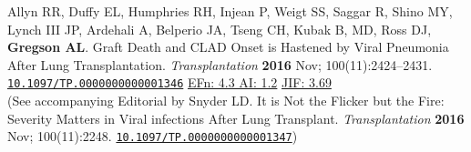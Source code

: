 \documentclass[letterpaper,11pt,sans,dvipsnames,final]{/usr/local/share/texmf-dist/tex/latex/moderncv/moderncv}%
\begin{document}
\begin{thebibliography}{1}
  \bibitem[33]{} Allyn RR, Duffy EL, Humphries RH, Injean P, Weigt SS, Saggar R, Shino MY, Lynch III JP, Ardehali A, Belperio JA, Tseng CH, Kubak B, MD, Ross DJ, \textbf{Gregson AL}. Graft Death and CLAD Onset is Hastened by Viral Pneumonia After Lung Transplantation. {\color{BrickRed}\textit{Transplantation}} \textbf{2016} Nov; 100(11):2424--2431. \href{http://ovidsp.tx.ovid.com/sp-3.20.0b/ovidweb.cgi?WebLinkFrameset=1&S=MPIKFPIHKADDNFMANCIKCCFBPPEGAA00&returnUrl=ovidweb.cgi%3fMain%2bSearch%2bPage%3d1%26S%3dMPIKFPIHKADDNFMANCIKCCFBPPEGAA00&directlink=http%3a%2f%2fovidsp.tx.ovid.com%2fovftpdfs%2fFPDDNCFBCCMAKA00%2ffs046%2fovft%2flive%2fgv025%2f00007890%2f00007890-900000000-97328.pdf&filename=Graft+Loss+and+Clad+Onset+is+Hastened+by+Viral+Pneumonia+After+Lung+Transplantation.&navigation_links=NavLinks.S.sh.22.1&link_from=S.sh.22%7c1&pdf_key=FPDDNCFBCCMAKA00&pdf_index=/fs046/ovft/live/gv025/00007890/00007890-900000000-97328&D=ovft&link_set=S.sh.22|1|sl_10|resultSet|S.sh.22.23|0}{\nolinkurl{10.1097/TP.0000000000001346}}
   {\color{NavyBlue}\href{http://52.6.43.8/projects/journalRank/rankings.php?bsearch=transplantation&searchby=journal&orderby=eigenfactor}{{\smaller EFn: 4.3 AI: 1.2}}     \href{http://admin-apps.webofknowledge.com/JCR/JCR?RQ=RECORD&rank=1&journal=TRANSPLANTATION}{{\smaller JIF: 3.69}}~ 
     }
  \\(See accompanying Editorial by Snyder LD. It is Not the Flicker but the Fire: Severity Matters in Viral infections After Lung Transplant. {\color{BrickRed}\textit{Transplantation}} \textbf{2016} Nov; 100(11):2248. \href{http://journals.lww.com/transplantjournal/Citation/onlinefirst/It_Is_Not_the_Flicker_but_the_Fire___Severity.97350.aspx}{\nolinkurl{10.1097/TP.0000000000001347}})

\end{thebibliography}
\end{document}
